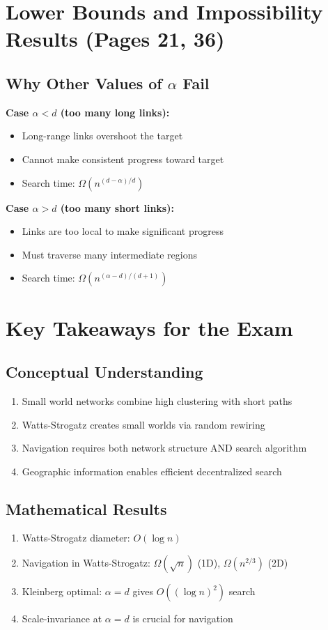 \documentclass[11pt,a4paper]{article}
\theoremstyle{definition}
\begin{document}
\section{Lower Bounds and Impossibility Results (Pages 21, 36)}
\subsection{Why Other Values of $\alpha$ Fail}
\textbf{Case $\alpha < d$ (too many long links):}
\begin{itemize}
\item Long-range links overshoot the target
\item Cannot make consistent progress toward target
\item Search time: $\Omega(n^{(d-\alpha)/d})$
\end{itemize}
\textbf{Case $\alpha > d$ (too many short links):}
\begin{itemize}
\item Links are too local to make significant progress
\item Must traverse many intermediate regions
\item Search time: $\Omega(n^{(\alpha-d)/(d+1)})$
\end{itemize}
\section{Key Takeaways for the Exam}
\subsection{Conceptual Understanding}
\begin{enumerate}
\item Small world networks combine high clustering with short paths
\item Watts-Strogatz creates small worlds via random rewiring
\item Navigation requires both network structure AND search algorithm
\item Geographic information enables efficient decentralized search
\end{enumerate}
\subsection{Mathematical Results}
\begin{enumerate}
\item Watts-Strogatz diameter: $O(\log n)$
\item Navigation in Watts-Strogatz: $\Omega(\sqrt{n})$ (1D), $\Omega(n^{2/3})$ (2D)
\item Kleinberg optimal: $\alpha = d$ gives $O((\log n)^2)$ search
\item Scale-invariance at $\alpha = d$ is crucial for navigation
\end{enumerate}
\end{document}
